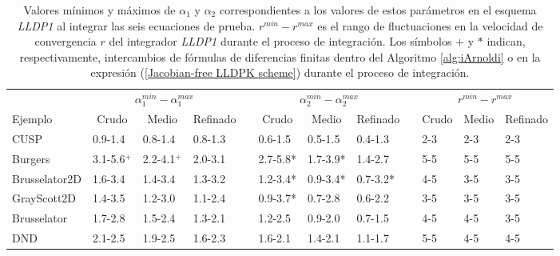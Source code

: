 \begin{table}
	\caption{Valores mínimos y máximos de $\alpha _{1}$ y $\alpha _{2}$ correspondientes a los valores de estos parámetros en el esquema \emph{LLDP1} al integrar las seis ecuaciones de prueba. $r^{min}-r^{max}$ es el rango de fluctuaciones en la velocidad de convergencia $r$ del integrador \emph{LLDP1} durante el proceso de integración. Los símbolos $+$ y $*$ indican, respectivamente, intercambios de fórmulas de diferencias finitas dentro del Algoritmo \ref{alg:iArnoldi} o en la expresión (\ref{Jacobian-free LLDPK scheme}) durante el proceso de integración.}
	\label{tab:R_LLDP1}
	\begin{adjustbox}{width=0.95\columnwidth,center}
		\begin{tabular}{lccccccccccc}
			& \multicolumn{3}{c}{$\alpha^{min}_{1}-\alpha^{max}_{1}$} &  & \multicolumn{3}{c}{$\alpha^{min}_{2}-\alpha^{max}_{2}$} &  & \multicolumn{3}{c}{$r^{min}-r^{max}$} \\
			\cline{2-4}\cline{6-8}\cline{10-12} Ejemplo & Crudo & Medio & Refinado &  & Crudo & Medio & Refinado &  & Crudo & Medio & Refinado \\
			\hline
			CUSP & \multicolumn{1}{l}{0.9-1.4} & \multicolumn{1}{l}{0.8-1.4} & \multicolumn{1}{l}{0.8-1.3} &  & \multicolumn{1}{l}{0.6-1.5} & \multicolumn{1}{l}{0.5-1.5} & \multicolumn{1}{l}{0.4-1.3} &  & \multicolumn{1}{l}{2-3} & \multicolumn{1}{l}{2-3} & \multicolumn{1}{l}{2-3} \\
			Burgers & \multicolumn{1}{l}{3.1-5.6$^+$} & \multicolumn{1}{l}{2.2-4.1$^+$} & \multicolumn{1}{l}{2.0-3.1} &  & \multicolumn{1}{l}{2.7-5.8*} & \multicolumn{1}{l}{1.7-3.9*} & \multicolumn{1}{l}{1.4-2.7} &  & \multicolumn{1}{l}{5-5} & \multicolumn{1}{l}{5-5} & \multicolumn{1}{l}{5-5} \\
			Brusselator2D & \multicolumn{1}{l}{1.6-3.4} & \multicolumn{1}{l}{1.4-3.4} & \multicolumn{1}{l}{1.3-3.2} &  & \multicolumn{1}{l}{1.2-3.4*} & \multicolumn{1}{l}{0.9-3.4*} & \multicolumn{1}{l}{0.7-3.2*} &  & \multicolumn{1}{l}{4-5} & \multicolumn{1}{l}{3-5} & \multicolumn{1}{l}{3-5} \\
			GrayScott2D & \multicolumn{1}{l}{1.4-3.5} & \multicolumn{1}{l}{1.2-3.0} & \multicolumn{1}{l}{1.1-2.4} &  & \multicolumn{1}{l}{0.9-3.7*} & \multicolumn{1}{l}{0.7-2.8} & \multicolumn{1}{l}{0.6-2.2} &  & \multicolumn{1}{l}{3-5} & \multicolumn{1}{l}{3-5} & \multicolumn{1}{l}{3-5} \\
			Brusselator & \multicolumn{1}{l}{1.7-2.8} & \multicolumn{1}{l}{1.5-2.4} & \multicolumn{1}{l}{1.3-2.1} &  & \multicolumn{1}{l}{1.2-2.5} & \multicolumn{1}{l}{0.9-2.0} & \multicolumn{1}{l}{0.7-1.5} &  & \multicolumn{1}{l}{4-5} & \multicolumn{1}{l}{4-5} & \multicolumn{1}{l}{3-5} \\
			DND & \multicolumn{1}{l}{2.1-2.5} & \multicolumn{1}{l}{1.9-2.5} & \multicolumn{1}{l}{1.6-2.3} &  & \multicolumn{1}{l}{1.6-2.1} & \multicolumn{1}{l}{1.4-2.1} & \multicolumn{1}{l}{1.1-1.7} &  & \multicolumn{1}{l}{5-5} & \multicolumn{1}{l}{4-5} & \multicolumn{1}{l}{4-5} \\
			\hline
		\end{tabular}
	\end{adjustbox}
\end{table}


